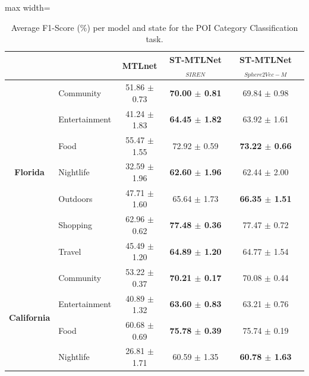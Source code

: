 \begin{table}[htbp]
\centering
\caption{Average F1-Score (\%) per model and state for the POI Category Classification task.}
\label{tab:courb:category}
\begin{adjustbox}{max width=\textwidth}
\begin{tabular}{clccc}
\toprule
 & & \textbf{MTLnet} & \textbf{ST-MTLNet$_{SIREN}$} & \textbf{ST-MTLNet$_{Sphere2Vec-M}$} \\
\midrule
\multirow{7}{*}{\textbf{Florida}} & Community & 51.86 $\pm$ 0.73 & \textbf{70.00 $\pm$ 0.81} & 69.84 $\pm$ 0.98 \\
 & Entertainment & 41.24 $\pm$ 1.83 & \textbf{64.45 $\pm$ 1.82} & 63.92 $\pm$ 1.61 \\
 & Food & 55.47 $\pm$ 1.55 & 72.92 $\pm$ 0.59 & \textbf{73.22 $\pm$ 0.66} \\
 & Nightlife & 32.59 $\pm$ 1.96 & \textbf{62.60 $\pm$ 1.96} & 62.44 $\pm$ 2.00 \\
 & Outdoors & 47.71 $\pm$ 1.60 & 65.64 $\pm$ 1.73 & \textbf{66.35 $\pm$ 1.51} \\
 & Shopping & 62.96 $\pm$ 0.62 & \textbf{77.48 $\pm$ 0.36} & 77.47 $\pm$ 0.72 \\
 & Travel & 45.49 $\pm$ 1.20 & \textbf{64.89 $\pm$ 1.20} & 64.77 $\pm$ 1.54 \\
\midrule
\multirow{7}{*}{\textbf{California}} & Community & 53.22 $\pm$ 0.37 & \textbf{70.21 $\pm$ 0.17} & 70.08 $\pm$ 0.44 \\
 & Entertainment & 40.89 $\pm$ 1.32 & \textbf{63.60 $\pm$ 0.83} & 63.21 $\pm$ 0.76 \\
 & Food & 60.68 $\pm$ 0.69 & \textbf{75.78 $\pm$ 0.39} & 75.74 $\pm$ 0.19 \\
 & Nightlife & 26.81 $\pm$ 1.71 & 60.59 $\pm$ 1.35 & \textbf{60.78 $\pm$ 1.63} \\

\end{tabular}
\end{adjustbox}
\end{table}
